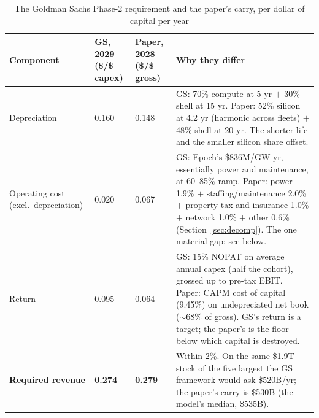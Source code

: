 \documentclass[11pt,letterpaper]{article}
\begin{document}
\begin{table}[htbp]
\centering\small
\caption{The Goldman Sachs Phase-2 requirement and the paper's carry, per dollar of capital per year}
\label{tab:gs_reconcile}
\begin{tabularx}{\textwidth}{L{3.0cm}L{1.6cm}L{1.6cm}X}
\toprule
\textbf{Component} & \textbf{GS, 2029 (\$/\$ capex)} & \textbf{Paper, 2028 (\$/\$ gross)} & \textbf{Why they differ} \\
\midrule
Depreciation & 0.160 & 0.148 & GS: 70\% compute at 5 yr $+$ 30\% shell at 15 yr. Paper: 52\% silicon at 4.2 yr (harmonic across fleets) $+$ 48\% shell at 20 yr. The shorter life and the smaller silicon share offset. \\
Operating cost (excl.\ depreciation) & 0.020 & 0.067 & GS: Epoch's \$836M/GW-yr, essentially power and maintenance, at 60--85\% ramp. Paper: power 1.9\% $+$ staffing/maintenance 2.0\% $+$ property tax and insurance 1.0\% $+$ network 1.0\% $+$ other 0.6\% (Section~\ref{sec:decomp}). The one material gap; see below. \\
Return & 0.095 & 0.064 & GS: 15\% NOPAT on average annual capex (half the cohort), grossed up to pre-tax EBIT. Paper: CAPM cost of capital (9.45\%) on undepreciated net book ($\sim$68\% of gross). GS's return is a target; the paper's is the floor below which capital is destroyed. \\
\midrule
\textbf{Required revenue} & \textbf{0.274} & \textbf{0.279} & Within 2\%. On the same \$1.9T stock of the five largest the GS framework would ask \$520B/yr; the paper's carry is \$530B (the model's median, \$535B). \\
\bottomrule
\end{tabularx}
\end{table}
\end{document}
